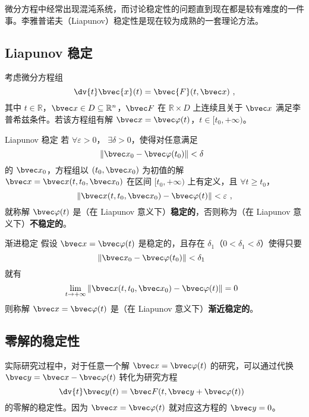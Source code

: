 
\begin{issues}
\issueMissDepend
\end{issues}

微分方程中经常出现混沌系统，而讨论稳定性的问题直到现在都是较有难度的一件事。李雅普诺夫（Liapunov）稳定性是现在较为成熟的一套理论方法。

\subsection{Liapunov 稳定}
考虑微分方程组 
\begin{equation}
\dv{t} \bvec{x}(t) = \bvec{F}(t, \bvec x) ~,
\end{equation}
其中 $t \in \mathbb R$，$\bvec x \in D \subseteq \mathbb R^n$，$\bvec F$ 在 $\mathbb R \times D$ 上连续且关于 $\bvec x$ 满足李普希兹条件。若该方程组有解 $\bvec x = \bvec \varphi(t)$，$t \in [t_0, +\infty)$。

\begin{definition}{Liapunov 稳定}
若 $\forall \varepsilon > 0$， $\exists \delta > 0$，使得对任意满足 
\begin{equation}
\Vert \bvec x_0 - \bvec \varphi(t_0)\Vert < \delta ~~
\end{equation}
的 $\bvec x_0$，方程组以 $(t_0, \bvec x_0)$ 为初值的解 $\bvec x= \bvec x(t, t_0, \bvec x_0)$ 在区间 $[t_0, +\infty)$ 上有定义，且 $\forall t \ge t_0$，
\begin{equation}
\Vert  \bvec x(t, t_0, \bvec x_0) - \bvec \varphi(t) \Vert < \varepsilon ~,
\end{equation}
就称解 $\bvec \varphi(t)$ 是（在 Liapunov 意义下）\textbf{稳定的}，否则称为（在 Liapunov 意义下）\textbf{不稳定的}。

\end{definition}

\begin{definition}{渐进稳定}
假设 $\bvec x = \bvec \varphi(t)$ 是稳定的，且存在 $\delta_1$（$0 < \delta_1 < \delta$）使得只要
\begin{equation}
\Vert \bvec x_0 - \bvec \varphi(t_0) \Vert < \delta_1 ~~
\end{equation}
就有
\begin{equation}
\lim_{t \to +\infty} \Vert  \bvec x(t, t_0, \bvec x_0) - \bvec \varphi(t) \Vert = 0 ~~
\end{equation}
则称解 $\bvec x = \bvec \varphi(t)$ 是（在 Liapunov 意义下）\textbf{渐近稳定的}。

\end{definition}

\subsection{零解的稳定性}
实际研究过程中，对于任意一个解 $\bvec x = \bvec \varphi(t)$ 的研究，可以通过代换 $\bvec y = \bvec x - \bvec \varphi(t)$ 转化为研究方程 
\begin{equation}
\dv{t} \bvec y(t) = \bvec F(t, \bvec y + \bvec \varphi(t)) ~~
\end{equation}
的零解的稳定性。因为 $\bvec x = \bvec \varphi(t)$ 就对应这方程的 $\bvec y= 0$。

